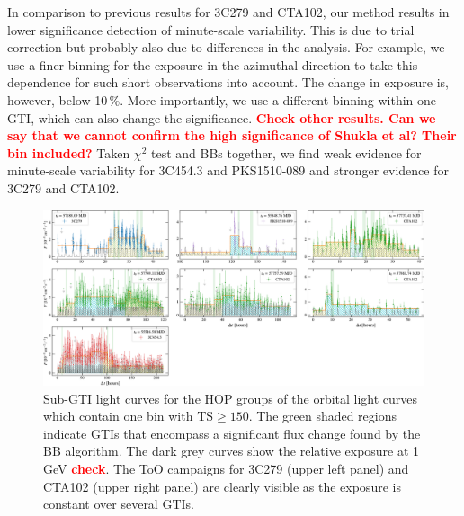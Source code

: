 \documentclass[twocolumn]{aastex62}
\newcommand{\todo}[1]{\textbf{\textcolor{red}{#1}}}
\begin{document}
In comparison to previous results for 3C279 and CTA102, our method results in lower significance detection of minute-scale variability. 
This is due to trial correction but probably also due to differences in the analysis. For example, we use a finer binning for the exposure in the azimuthal direction to take this dependence for such short observations into account. 
The change in exposure is, however, below 10\,\%.
More importantly, we use a different binning within one GTI, which can also change the significance. 
\todo{Check other results. Can we say that we cannot confirm the high significance of Shukla et al? Their bin included?} 
Taken $\chi^2$ test and BBs together, we find weak evidence for minute-scale variability for 3C454.3 and PKS1510-089 and stronger evidence for 3C279 and CTA102.
\begin{figure}
    \centering
    \includegraphics[width = .9\linewidth]{figures/lc_minute_3min.pdf}
    \caption{Sub-GTI light curves for the HOP groups of the orbital light curves which contain one bin with $\mathrm{TS} \geqslant 150$. The green shaded regions indicate GTIs that encompass a significant flux change found by the BB algorithm. The dark grey curves show the relative exposure at 1\,GeV \todo{check}. The ToO campaigns for 3C279 (upper left panel) and CTA102 (upper right panel) are clearly visible as the exposure is constant over several GTIs. }
    \label{fig:lc_minutes}
\end{figure}
\end{document}
